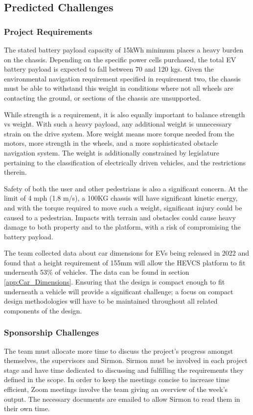 \documentclass [12pt]{article}
\begin{document}
\subsection{Predicted Challenges}\label{sec:predicted_challenges}

\subsubsection{Project Requirements}
The stated battery payload capacity of 15kWh minimum places a heavy burden on the chassis. Depending on the specific power cells purchased, the total EV battery payload is expected to fall between 70 and 120 kgs. Given the environmental navigation requirement specified in requirement two, the chassis must be able to withstand this weight in conditions where not all wheels are contacting the ground, or sections of the chassis are unsupported.

While strength is a requirement, it is also equally important to balance strength vs weight. With such a heavy payload, any additional weight is unnecessary strain on the drive system. More weight means more torque needed from the motors, more strength in the wheels, and a more sophisticated obstacle navigation system. The weight is additionally constrained by legislature pertaining to the classification of electrically driven vehicles, and the restrictions therein.

Safety of both the user and other pedestrians is also a significant concern. At the limit of 4 mph (1.8 m/s), a 100KG chassis will have significant kinetic energy, and with the torque required to move such a weight, significant injury could be caused to a pedestrian. Impacts with terrain and obstacles could cause heavy damage to both property and to the platform, with a risk of compromising the battery payload.

The team collected data about car dimensions for EVs being released in 2022 and found that a height requirement of 155mm will allow the HEVCS platform to fit underneath 53\% of vehicles. The data can be found in section \ref{app:Car_Dimensions}. Ensuring that the design is compact enough to fit underneath a vehicle will provide a significant challenge; a focus on compact design methodologies will have to be maintained throughout all related components of the design.


\subsubsection{Sponsorship Challenges}
The team must allocate more time to discuss the project's progress amongst themselves, the supervisors and Sirmon. Sirmon must be involved in each project stage and have time dedicated to discussing and fulfilling the requirements they defined in the scope. In order to keep the meetings concise to increase time efficient, Zoom meetings involve the team giving an overview of the week's output. The necessary documents are emailed to allow Sirmon to read them in their own time.
\end{document}
